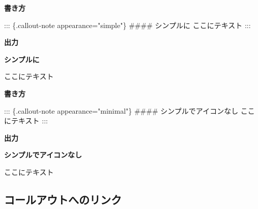 \documentclass[
  b5paper,
  xelatex, ja=standard]{bxjsbook}
\newenvironment{Shaded}{\begin{snugshade}}{\end{snugshade}}
\newcommand{\FunctionTok}[1]{\textcolor[rgb]{0.28,0.35,0.67}{#1}}
\newcommand{\NormalTok}[1]{\textcolor[rgb]{0.00,0.23,0.31}{#1}}
\begin{document}
\textbf{書き方}

\begin{Shaded}
\begin{Highlighting}[]
\NormalTok{::: \{.callout{-}note appearance="simple"\}}
\FunctionTok{\#\#\#\# シンプルに}
\NormalTok{ここにテキスト}
\NormalTok{:::}
\end{Highlighting}
\end{Shaded}

\textbf{出力}

\begin{tcolorbox}[enhanced jigsaw, colback=white, breakable, opacityback=0, left=2mm, arc=.35mm, rightrule=.15mm, colframe=quarto-callout-note-color-frame, toprule=.15mm, bottomrule=.15mm, leftrule=.75mm]
\begin{minipage}[t]{5.5mm}
\textcolor{quarto-callout-note-color}{\faInfo}
\end{minipage}%
\begin{minipage}[t]{\textwidth - 5.5mm}

\vspace{-3mm}\textbf{シンプルに}\vspace{3mm}

ここにテキスト

\end{minipage}%
\end{tcolorbox}

\textbf{書き方}

\begin{Shaded}
\begin{Highlighting}[]
\NormalTok{::: \{.callout{-}note appearance="minimal"\}}
\FunctionTok{\#\#\#\# シンプルでアイコンなし}
\NormalTok{ここにテキスト}
\NormalTok{:::}
\end{Highlighting}
\end{Shaded}

\textbf{出力}

\begin{tcolorbox}[enhanced jigsaw, colback=white, breakable, opacityback=0, left=2mm, arc=.35mm, rightrule=.15mm, colframe=quarto-callout-note-color-frame, toprule=.15mm, bottomrule=.15mm, leftrule=.75mm]

\vspace{-3mm}\textbf{シンプルでアイコンなし}\vspace{3mm}

ここにテキスト

\end{tcolorbox}

\subsection{コールアウトへのリンク}\label{ux30b3ux30fcux30ebux30a2ux30a6ux30c8ux3078ux306eux30eaux30f3ux30af}
\end{document}
